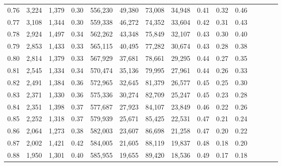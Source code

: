 \begin{tabular}{rrrcrrrrrrrrrrr}
0.76 &   3,224 &  1,379 &                                       0.30 &  556,230 &   49,380 &   73,008 &   34,948 &  0.41 &  0.32 &                         0.46 \\
0.77 &   3,108 &  1,344 &                                       0.30 &  559,338 &   46,272 &   74,352 &   33,604 &  0.42 &  0.31 &                         0.43 \\
0.78 &   2,924 &  1,497 &                                       0.34 &  562,262 &   43,348 &   75,849 &   32,107 &  0.43 &  0.30 &                         0.40 \\
0.79 &   2,853 &  1,433 &                                       0.33 &  565,115 &   40,495 &   77,282 &   30,674 &  0.43 &  0.28 &                         0.38 \\
0.80 &   2,814 &  1,379 &                                       0.33 &  567,929 &   37,681 &   78,661 &   29,295 &  0.44 &  0.27 &                         0.35 \\
0.81 &   2,545 &  1,334 &                                       0.34 &  570,474 &   35,136 &   79,995 &   27,961 &  0.44 &  0.26 &                         0.33 \\
0.82 &   2,491 &  1,384 &                                       0.36 &  572,965 &   32,645 &   81,379 &   26,577 &  0.45 &  0.25 &                         0.30 \\
0.83 &   2,371 &  1,330 &                                       0.36 &  575,336 &   30,274 &   82,709 &   25,247 &  0.45 &  0.23 &                         0.28 \\
0.84 &   2,351 &  1,398 &                                       0.37 &  577,687 &   27,923 &   84,107 &   23,849 &  0.46 &  0.22 &                         0.26 \\
0.85 &   2,252 &  1,318 &                                       0.37 &  579,939 &   25,671 &   85,425 &   22,531 &  0.47 &  0.21 &                         0.24 \\
0.86 &   2,064 &  1,273 &                                       0.38 &  582,003 &   23,607 &   86,698 &   21,258 &  0.47 &  0.20 &                         0.22 \\
0.87 &   2,002 &  1,421 &                                       0.42 &  584,005 &   21,605 &   88,119 &   19,837 &  0.48 &  0.18 &                         0.20 \\
0.88 &   1,950 &  1,301 &                                       0.40 &  585,955 &   19,655 &   89,420 &   18,536 &  0.49 &  0.17 &                         0.18 \\

\end{tabular}
